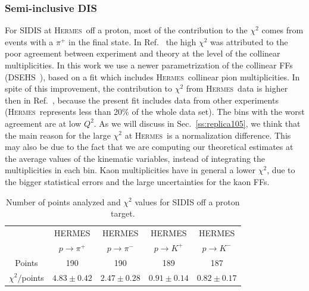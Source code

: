 \documentclass[aps,preprintnumbers,showpacs,nofootinbib,superscriptaddress,floatfix]{revtex4}
\newcommand{\hermes}{\textsc{Hermes}}
\begin{document}
\subsubsection*{Semi-inclusive DIS}
\label{sss:SIDIS_agreement}


For SIDIS at \hermes\ off a proton, 
most of the contribution to the $\chi^2$ comes from events with a $\pi^+$ in the final state. 
In Ref.~\cite{Signori:2013mda} the high $\chi^2$ was attributed to the
poor agreement between experiment and theory at
the level of the collinear multiplicities. 
In this work we use a newer parametrization of the collinear FFs
(DSEHS~\cite{deFlorian:2014xna}), based on a fit which includes \hermes\
collinear pion multiplicities.  In spite of this improvement, the
contribution to $\chi^2$ from \hermes\ data is higher then in
Ref.~\cite{Signori:2013mda}, because the
present fit includes data from other experiments (\hermes\ represents less
than 20\% of the whole data set).
The bins with the worst agreement are at low $Q^2$. As we will discuss in
Sec.~\ref{ss:replica105}, we think that the main reason for the large $\chi^2$
at \hermes\ is a normalization difference. This may also be due to the fact
that we are computing our theoretical estimates at the average values of the
kinematic variables, instead of integrating the multiplicities in each bin. 
Kaon multiplicities have in general a lower $\chi^2$, due to the bigger
statistical errors and the large
uncertainties for the kaon FFs. 

\begin{table}[h!]
\begin{center}
\begin{tabular}{|c|c|c|c|c|}
 \hline
\hline
  & HERMES & HERMES & HERMES & HERMES \\   
 &  $p \to \pi^+$    &   $p \to \pi^-$    &  $p \to K^+$    &   $p \to K^-$
 \\
 \hline
 Points         &  190 & 190 & 189 & 187       \\
 \hline
$\chi^2 /$points & $4 .83\pm 0.42$ & $2 .47\pm 0.28$ & $0 .91\pm 0.14$ & $0 .82\pm 0.17$   \\            
\hline
\hline
\end{tabular}
\caption{Number of points analyzed and $\chi^2$ values for SIDIS off a proton target.}
\label{t:fl_ind_chi2_eP}
\end{center}
\end{table}
\end{document}
